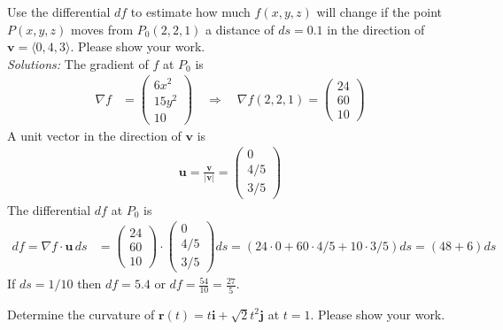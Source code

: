     Use the differential $df$ to estimate how much $f(x,y,z)$ will change if the point $P(x,y,z)$ moves from $P_0(2,2,1)$ a distance of $ds = 0.1$ in the direction of $\mathbf v = \langle 0,4,3 \rangle$. Please show your work. 
    \ifnum {} {\color{DarkBlue} \\ \textit{Solutions:} 
    The gradient of $f$ at $P_0$ is
    \begin{align}
        \nabla f &= \begin{pmatrix} 6x^2\\15y^2\\10\end{pmatrix} 
        \quad \Rightarrow \quad 
        \nabla f(2,2,1) = \begin{pmatrix} 24\\60\\10\end{pmatrix} 
    \end{align}
    A unit vector in the direction of $\mathbf v$ is
    \begin{align}
        \mathbf u = \frac{\mathbf v}{|\mathbf v|} = \begin{pmatrix} 0\\4/5\\3/5 \end{pmatrix}
    \end{align}
    The differential $df$ at $P_0$ is
    \begin{align}
        df = \nabla f \cdot \mathbf u \, ds 
        &= \begin{pmatrix} 24\\60\\10\end{pmatrix} \cdot \begin{pmatrix} 0\\4/5\\3/5 \end{pmatrix} ds 
        = (24\cdot 0 + 60 \cdot 4/5 + 10 \cdot 3/5) ds = (48+6)ds
    \end{align}
    If $ds = 1/10$ then $df = 5.4$ or $df = \frac{54}{10}=\frac{27}{5}$.
    }
    \else
    \vspace{7cm}
    \fi
\fi

\ifnum {}
\question[4] Determine the curvature of $\mathbf r(t) = t\mathbf i + \sqrt2t^2\mathbf j$ at $t=1$. Please show your work. 

